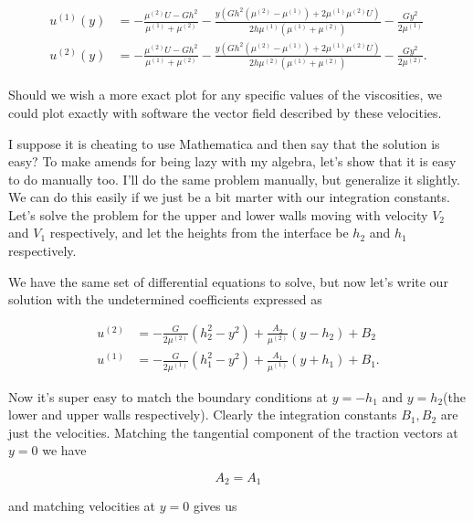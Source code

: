 \begin{align}\label{eqn:continuumProblemSet2:840}
u^{(1)}(y) &= -\frac{\mu^{(2)} U -G h^2}{\mu^{(1)}+\mu^{(2)}}-\frac{y \left(G h^2 (\mu^{(2)} -\mu^{(1)}) +2 \mu^{(1)} \mu^{(2)} U \right)}{2 h \mu^{(1)} \left(\mu^{(1)}+\mu^{(2)}\right)}-\frac{G y^2}{2 \mu^{(1)}} \\
u^{(2)}(y) &= -\frac{\mu^{(2)} U -G h^2}{\mu^{(1)}+\mu^{(2)}}-\frac{y \left(G h^2 (\mu^{(2)} -\mu^{(1)}) +2 \mu^{(1)} \mu^{(2)} U \right)}{2 h \mu^{(2)} \left(\mu^{(1)}+\mu^{(2)}\right)}-\frac{G y^2}{2 \mu^{(2)}}.
\end{align}

Should we wish a more exact plot for any specific values of the viscosities, we could plot exactly with software the vector field described by these velocities.

I suppose it is cheating to use Mathematica and then say that the solution is easy?  To make amends for being lazy with my algebra, let's show that it is easy to do manually too.  I'll do the same problem manually, but generalize it slightly.  We can do this easily if we just be a bit marter with our integration constants.  Let's solve the problem for the upper and lower walls moving with velocity $V_2$ and $V_1$ respectively, and let the heights from the interface be $h_2$ and $h_1$ respectively.  %
%

We have the same set of differential equations to solve, but now let's write our solution with the undetermined coefficients expressed as

\begin{align}\label{eqn:continuumProblemSet2:860}
u^{(2)} &= -\frac{G}{2 \mu^{(2)}}\left( h_2^2 - y^2 \right) + \frac{A_2}{\mu^{(2)}} (y - h_2) + B_2 \\
u^{(1)} &= -\frac{G}{2 \mu^{(1)}}\left( h_1^2 - y^2 \right) + \frac{A_1}{\mu^{(1)}} (y + h_1) + B_1.
\end{align}

Now it's super easy to match the boundary conditions at $y = -h_1$ and $y = h_2$(the lower and upper walls respectively).  Clearly the integration constants $B_1,B_2$ are just the velocities.  Matching the tangential component of the traction vectors at $y = 0$ we have

\begin{equation}\label{eqn:continuumProblemSet2:880}
A_2 = A_1
\end{equation}

and matching velocities at $y = 0$ gives us

